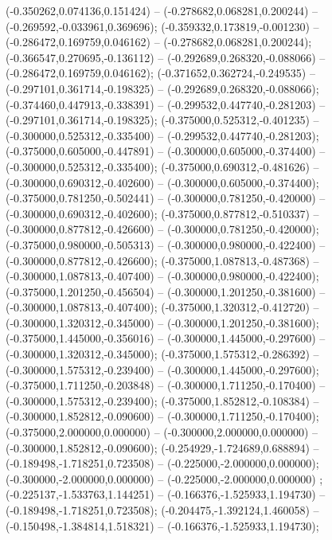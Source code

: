  (-0.350262,0.074136,0.151424) -- (-0.278682,0.068281,0.200244) -- (-0.269592,-0.033961,0.369696);
 (-0.359332,0.173819,-0.001230) -- (-0.286472,0.169759,0.046162) -- (-0.278682,0.068281,0.200244);
 (-0.366547,0.270695,-0.136112) -- (-0.292689,0.268320,-0.088066) -- (-0.286472,0.169759,0.046162);
 (-0.371652,0.362724,-0.249535) -- (-0.297101,0.361714,-0.198325) -- (-0.292689,0.268320,-0.088066);
 (-0.374460,0.447913,-0.338391) -- (-0.299532,0.447740,-0.281203) -- (-0.297101,0.361714,-0.198325);
 (-0.375000,0.525312,-0.401235) -- (-0.300000,0.525312,-0.335400) -- (-0.299532,0.447740,-0.281203);
 (-0.375000,0.605000,-0.447891) -- (-0.300000,0.605000,-0.374400) -- (-0.300000,0.525312,-0.335400);
 (-0.375000,0.690312,-0.481626) -- (-0.300000,0.690312,-0.402600) -- (-0.300000,0.605000,-0.374400);
 (-0.375000,0.781250,-0.502441) -- (-0.300000,0.781250,-0.420000) -- (-0.300000,0.690312,-0.402600);
 (-0.375000,0.877812,-0.510337) -- (-0.300000,0.877812,-0.426600) -- (-0.300000,0.781250,-0.420000);
 (-0.375000,0.980000,-0.505313) -- (-0.300000,0.980000,-0.422400) -- (-0.300000,0.877812,-0.426600);
 (-0.375000,1.087813,-0.487368) -- (-0.300000,1.087813,-0.407400) -- (-0.300000,0.980000,-0.422400);
 (-0.375000,1.201250,-0.456504) -- (-0.300000,1.201250,-0.381600) -- (-0.300000,1.087813,-0.407400);
 (-0.375000,1.320312,-0.412720) -- (-0.300000,1.320312,-0.345000) -- (-0.300000,1.201250,-0.381600);
 (-0.375000,1.445000,-0.356016) -- (-0.300000,1.445000,-0.297600) -- (-0.300000,1.320312,-0.345000);
 (-0.375000,1.575312,-0.286392) -- (-0.300000,1.575312,-0.239400) -- (-0.300000,1.445000,-0.297600);
 (-0.375000,1.711250,-0.203848) -- (-0.300000,1.711250,-0.170400) -- (-0.300000,1.575312,-0.239400);
 (-0.375000,1.852812,-0.108384) -- (-0.300000,1.852812,-0.090600) -- (-0.300000,1.711250,-0.170400);
 (-0.375000,2.000000,0.000000) -- (-0.300000,2.000000,0.000000) -- (-0.300000,1.852812,-0.090600);
 (-0.254929,-1.724689,0.688894) -- (-0.189498,-1.718251,0.723508) -- (-0.225000,-2.000000,0.000000);
 (-0.300000,-2.000000,0.000000) -- (-0.225000,-2.000000,0.000000) ;
 (-0.225137,-1.533763,1.144251) -- (-0.166376,-1.525933,1.194730) -- (-0.189498,-1.718251,0.723508);
 (-0.204475,-1.392124,1.460058) -- (-0.150498,-1.384814,1.518321) -- (-0.166376,-1.525933,1.194730);
